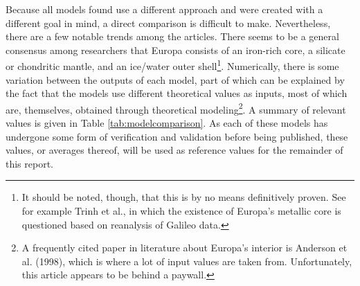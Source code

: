 \documentclass[twocolumn]{article}
\begin{document}
Because all models found use a different approach and were created with a different goal in mind, a direct comparison is difficult to make. Nevertheless, there are a few notable trends among the articles. There seems to be a general consensus among researchers that Europa consists of an iron-rich core, a silicate or chondritic mantle, and an ice/water outer shell\footnote{It should be noted, though, that this is by no means definitively proven. See for example Trinh et al.\cite{trinhSlowEvolutionEuropas2023}, in which the existence of Europa's metallic core is questioned based on reanalysis of Galileo data.}. Numerically, there is some variation between the outputs of each model, part of which can be explained by the fact that the models use different theoretical values as inputs, most of which are, themselves, obtained through theoretical modeling\footnote{A frequently cited paper in literature about Europa's interior is Anderson et al. (1998)\cite{andersonEuropasDifferentiatedInternal1998}, which is where a lot of input values are taken from. Unfortunately, this article appears to be behind a paywall.}. A summary of relevant values is given in Table \ref{tab:modelcomparison}. As each of these models has undergone some form of verification and validation before being published, these values, or averages thereof, will be used as reference values for the remainder of this report.
\end{document}
